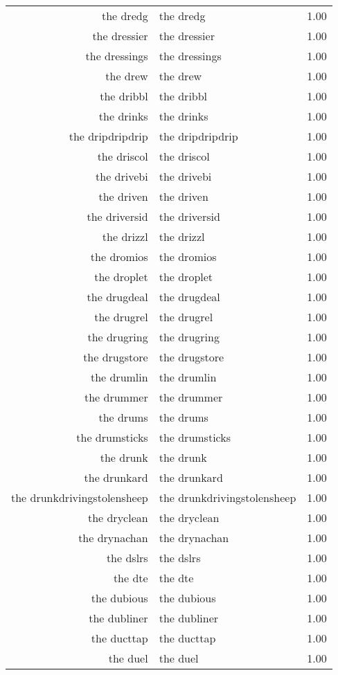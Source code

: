 \begin{table}[ht]
\begin{tabular}{rlr}
  the dredg & the dredg & 1.00 \\ 
  the dressier & the dressier & 1.00 \\ 
  the dressings & the dressings & 1.00 \\ 
  the drew & the drew & 1.00 \\ 
  the dribbl & the dribbl & 1.00 \\ 
  the drinks & the drinks & 1.00 \\ 
  the dripdripdrip & the dripdripdrip & 1.00 \\ 
  the driscol & the driscol & 1.00 \\ 
  the drivebi & the drivebi & 1.00 \\ 
  the driven & the driven & 1.00 \\ 
  the driversid & the driversid & 1.00 \\ 
  the drizzl & the drizzl & 1.00 \\ 
  the dromios & the dromios & 1.00 \\ 
  the droplet & the droplet & 1.00 \\ 
  the drugdeal & the drugdeal & 1.00 \\ 
  the drugrel & the drugrel & 1.00 \\ 
  the drugring & the drugring & 1.00 \\ 
  the drugstore & the drugstore & 1.00 \\ 
  the drumlin & the drumlin & 1.00 \\ 
  the drummer & the drummer & 1.00 \\ 
  the drums & the drums & 1.00 \\ 
  the drumsticks & the drumsticks & 1.00 \\ 
  the drunk & the drunk & 1.00 \\ 
  the drunkard & the drunkard & 1.00 \\ 
  the drunkdrivingstolensheep & the drunkdrivingstolensheep & 1.00 \\ 
  the dryclean & the dryclean & 1.00 \\ 
  the drynachan & the drynachan & 1.00 \\ 
  the dslrs & the dslrs & 1.00 \\ 
  the dte & the dte & 1.00 \\ 
  the dubious & the dubious & 1.00 \\ 
  the dubliner & the dubliner & 1.00 \\ 
  the ducttap & the ducttap & 1.00 \\ 
  the duel & the duel & 1.00 \\ 

\end{tabular}
\end{table}
